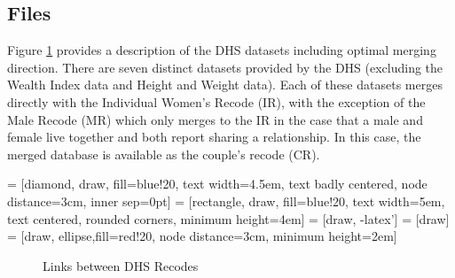 \documentclass{article}[11pt,subeqn]
\begin{document}
\begin{spacing}{1.25}
\section{Files}
\label{scn:files}
Figure \ref{fig:DHS} provides a description of the DHS datasets including optimal merging direction.
There are seven distinct datasets provided by the DHS (excluding the Wealth Index data and Height
and Weight data).  Each of these datasets merges directly with the Individual Women's Recode (IR),
with the exception of the Male Recode (MR) which only merges to the IR in the case that a male
and female live together and both report sharing a relationship.  In this case, the merged database is
available as the couple's recode (CR).

 = [diamond, draw, fill=blue!20, 
    text width=4.5em, text badly centered, node distance=3cm, inner sep=0pt]
 = [rectangle, draw, fill=blue!20, 
    text width=5em, text centered, rounded corners, minimum height=4em]
 = [draw, -latex']
 = [draw]
 = [draw, ellipse,fill=red!20, node distance=3cm,
    minimum height=2em]

\begin{figure}[ht!]
\begin{center}
\caption{Links between DHS Recodes}
\label{fig:DHS}
\end{center}
\end{figure}
\end{spacing}
\end{document}
